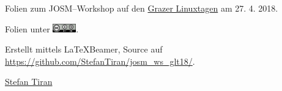 \documentclass{beamer}
\begin{document}
\begin{frame}
Folien zum JOSM--Workshop auf den
\href{http://http://linuxtage.at/}{Grazer Linuxtagen} am 27. 4. 2018.
\vspace{1cm}

Folien unter \includegraphics[width=1cm]{cc-by-sa.png}.
\vspace{1cm}

Erstellt mittels \LaTeX Beamer, Source auf \url{https://github.com/StefanTiran/josm_ws_glt18/}.
\vspace{1cm}

\href{mailto:osm@stefantiran.at}{Stefan Tiran}
\end{frame}
\end{document}
